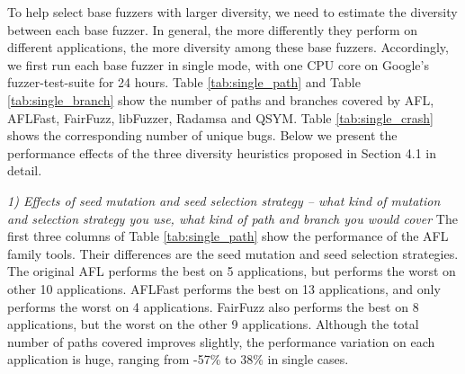 To help select base fuzzers with larger diversity, we need to estimate the diversity between each base fuzzer. In general, the more differently they perform on different
applications, the more diversity among these base fuzzers.
Accordingly, we first run each base fuzzer in single mode, with one CPU core on Google's fuzzer-test-suite for 24 hours. 
Table \ref{tab:single_path} and Table \ref{tab:single_branch} show the number of paths and branches covered by AFL, AFLFast, FairFuzz, libFuzzer, Radamsa and QSYM. Table \ref{tab:single_crash} shows the corresponding number of unique bugs. Below we present the performance effects of the three diversity heuristics proposed in Section 4.1 in detail. 


\textit{1) Effects of seed mutation and seed selection strategy -- what kind of mutation and selection strategy you use, what kind of path and branch you would cover}
The first three columns of Table \ref{tab:single_path} show the performance of the AFL family tools. Their differences are the seed mutation and seed selection strategies. The original AFL performs the best on 5 applications, but  performs the worst on other 10 applications. 
AFLFast performs the best on 13 applications, and only performs the worst on 4 applications. FairFuzz also performs the best on 8 applications, but the worst on the other 9 applications.
Although the total number of paths covered improves slightly, the performance variation on each application is huge, ranging from -57\% to 38\% in single cases.


